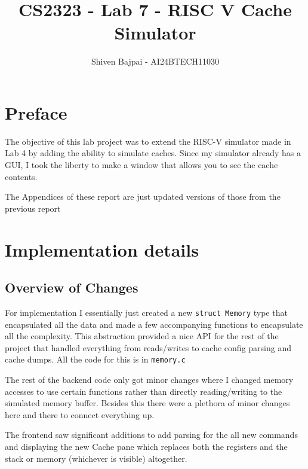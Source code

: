\documentclass[12pt]{article}
\begin{document}
	
	\vspace{3cm}

	\title{CS2323 - Lab 7 - RISC V Cache Simulator}
	\author{Shiven Bajpai - AI24BTECH11030}

	\maketitle
	\bigskip    	

	\renewcommand{\thefigure}{\theenumi}
	\renewcommand{\thetable}{\theenumi}

	\tableofcontents
	\newpage

	\section{Preface}
	
	The objective of this lab project was to extend the RISC-V simulator made in Lab 4 by adding the ability to simulate caches. Since my simulator already has a GUI, I took the liberty to make a window that allows you to see the cache contents.

	The Appendices of these report are just updated versions of those from the previous report
	
	\section{Implementation details}

	\subsection{Overview of Changes}

	For implementation I essentially just created a new \verb|struct Memory| type that encapsulated all the data and made a few accompanying functions to encapsulate all the complexity. This abstraction provided a nice API for the rest of the project that handled everything from reads/writes to cache config parsing and cache dumps. All the code for this is in \verb|memory.c|
	
	The rest of the backend code only got minor changes where I changed memory accesses to use certain functions rather than directly reading/writing to the simulated memory buffer. Besides this there were a plethora of minor changes here and there to connect everything up.

	The frontend saw significant additions to add parsing for the all new commands and displaying the new Cache pane which replaces both the registers and the stack or memory (whichever is visible) altogether.
\end{document}
